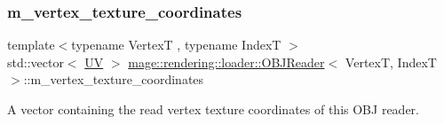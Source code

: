 \subsubsection{\texorpdfstring{m\+\_\+vertex\+\_\+texture\+\_\+coordinates}{m\_vertex\_texture\_coordinates}}
{\footnotesize\ttfamily template$<$typename VertexT , typename IndexT $>$ \\
std\+::vector$<$ \hyperlink{structmage_1_1_u_v}{UV} $>$ \hyperlink{classmage_1_1rendering_1_1loader_1_1_o_b_j_reader}{mage\+::rendering\+::loader\+::\+O\+B\+J\+Reader}$<$ VertexT, IndexT $>$\+::m\+\_\+vertex\+\_\+texture\+\_\+coordinates\hspace{0.3cm}{\ttfamily [private]}}

A vector containing the read vertex texture coordinates of this O\+BJ reader. 